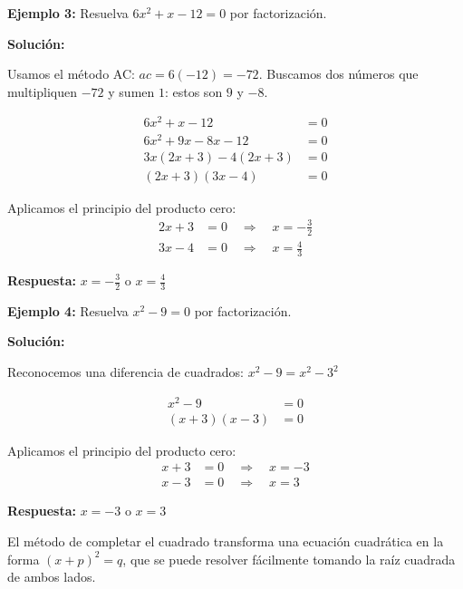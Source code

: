 \begin{example}
\textbf{Ejemplo 3:} Resuelva $6x^2 + x - 12 = 0$ por factorización.

\textbf{Solución:}

Usamos el método AC: $ac = 6(-12) = -72$. Buscamos dos números que multipliquen $-72$ y sumen $1$: estos son $9$ y $-8$.

\begin{align}
6x^2 + x - 12 &= 0\\
6x^2 + 9x - 8x - 12 &= 0\\
3x(2x + 3) - 4(2x + 3) &= 0\\
(2x + 3)(3x - 4) &= 0
\end{align}

Aplicamos el principio del producto cero:
\begin{align}
2x + 3 &= 0 \quad \Rightarrow \quad x = -\frac{3}{2}\\
3x - 4 &= 0 \quad \Rightarrow \quad x = \frac{4}{3}
\end{align}

\textbf{Respuesta:} $x = -\frac{3}{2}$ o $x = \frac{4}{3}$
\end{example}

\begin{example}
\textbf{Ejemplo 4:} Resuelva $x^2 - 9 = 0$ por factorización.

\textbf{Solución:}

Reconocemos una diferencia de cuadrados: $x^2 - 9 = x^2 - 3^2$

\begin{align}
x^2 - 9 &= 0\\
(x + 3)(x - 3) &= 0
\end{align}

Aplicamos el principio del producto cero:
\begin{align}
x + 3 &= 0 \quad \Rightarrow \quad x = -3\\
x - 3 &= 0 \quad \Rightarrow \quad x = 3
\end{align}

\textbf{Respuesta:} $x = -3$ o $x = 3$
\end{example}

\newpage

El método de completar el cuadrado transforma una ecuación cuadrática en la forma $(x + p)^2 = q$, que se puede resolver fácilmente tomando la raíz cuadrada de ambos lados.

